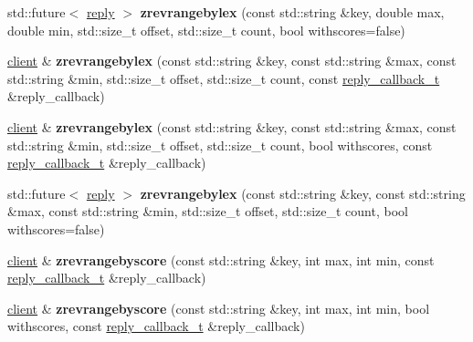\begin{DoxyCompactItemize}
\item 
\mbox{\label{classcpp__redis_1_1client_a1065a119482b3897adefb4a0607e6231}} 
std\+::future$<$ \hyperlink{classcpp__redis_1_1reply}{reply} $>$ {\bfseries zrevrangebylex} (const std\+::string \&key, double max, double min, std\+::size\+\_\+t offset, std\+::size\+\_\+t count, bool withscores=false)
\item 
\mbox{\label{classcpp__redis_1_1client_a51711a1cb71e28ddcf0f91020f8a47fa}} 
\hyperlink{classcpp__redis_1_1client}{client} \& {\bfseries zrevrangebylex} (const std\+::string \&key, const std\+::string \&max, const std\+::string \&min, std\+::size\+\_\+t offset, std\+::size\+\_\+t count, const \hyperlink{classcpp__redis_1_1client_a061a1140d36d2eaeda82b09a0bb3f9f2}{reply\+\_\+callback\+\_\+t} \&reply\+\_\+callback)
\item 
\mbox{\label{classcpp__redis_1_1client_a890895091a341a9d7cd7f029444a5745}} 
\hyperlink{classcpp__redis_1_1client}{client} \& {\bfseries zrevrangebylex} (const std\+::string \&key, const std\+::string \&max, const std\+::string \&min, std\+::size\+\_\+t offset, std\+::size\+\_\+t count, bool withscores, const \hyperlink{classcpp__redis_1_1client_a061a1140d36d2eaeda82b09a0bb3f9f2}{reply\+\_\+callback\+\_\+t} \&reply\+\_\+callback)
\item 
\mbox{\label{classcpp__redis_1_1client_a281b9f496d324f25b90bb97e15a4b7aa}} 
std\+::future$<$ \hyperlink{classcpp__redis_1_1reply}{reply} $>$ {\bfseries zrevrangebylex} (const std\+::string \&key, const std\+::string \&max, const std\+::string \&min, std\+::size\+\_\+t offset, std\+::size\+\_\+t count, bool withscores=false)
\item 
\mbox{\label{classcpp__redis_1_1client_a6b5bd2e7e646e785116726f3413afeb3}} 
\hyperlink{classcpp__redis_1_1client}{client} \& {\bfseries zrevrangebyscore} (const std\+::string \&key, int max, int min, const \hyperlink{classcpp__redis_1_1client_a061a1140d36d2eaeda82b09a0bb3f9f2}{reply\+\_\+callback\+\_\+t} \&reply\+\_\+callback)
\item 
\mbox{\label{classcpp__redis_1_1client_a8ac323056b0b2948949844eccd6c8215}} 
\hyperlink{classcpp__redis_1_1client}{client} \& {\bfseries zrevrangebyscore} (const std\+::string \&key, int max, int min, bool withscores, const \hyperlink{classcpp__redis_1_1client_a061a1140d36d2eaeda82b09a0bb3f9f2}{reply\+\_\+callback\+\_\+t} \&reply\+\_\+callback)

\end{DoxyCompactItemize}
